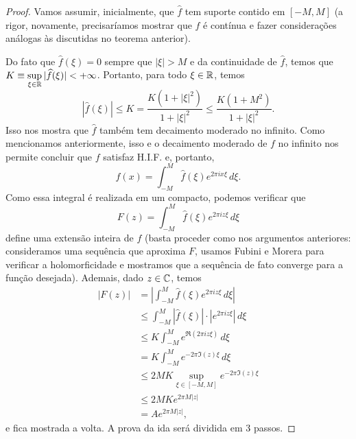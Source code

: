        \begin{proof}
            Vamos assumir, inicialmente, que $\widehat{f}$ tem suporte contido em $[-M,M]$ 
            (a rigor, novamente, precisaríamos mostrar que $\widehat{f}$ é contínua e fazer
            considerações análogas às discutidas no teorema anterior).
            
            Do fato que $\widehat{f}(\xi) = 0$ sempre que $|\xi| > M$ e da continuidade de $\widehat{f}$, 
            temos que $\displaystyle{ K\equiv \sup_{\xi\in\mathbb{R}} |\widehat{f}(\xi)| < +\infty }$.
            Portanto, para todo $\xi\in\mathbb{R}$, temos
            \begin{equation*}
                |\widehat{f}(\xi)| \leq K = \frac{K(1+|\xi|^2)}{1+|\xi|^2} \leq \frac{K(1 + M^2)}{1+|\xi|^2}.
            \end{equation*}
            Isso nos mostra que $\widehat{f}$ também tem decaimento moderado no infinito. Como 
            mencionamos anteriormente, isso e o decaimento moderado de $f$ no infinito nos permite
            concluir que $f$ satisfaz H.I.F. e, portanto,
            \begin{equation*}
                f(x) = \int_{-M}^M \widehat{f}(\xi) e^{2\pi ix\xi} \, d\xi.
            \end{equation*}
            Como essa integral é realizada em um compacto, podemos verificar que
            \begin{equation*}
                F(z) = \int_{-M}^M \widehat{f}(\xi) e^{2\pi iz\xi} \, d\xi
            \end{equation*}
            define uma extensão inteira de $f$ (basta proceder como
            nos argumentos anteriores: consideramos uma sequência
            que aproxima $F$, usamos Fubini e Morera para verificar
            a holomorficidade e mostramos que a sequência de fato
            converge para a função desejada). Ademais, dado $z\in\mathbb{C}$, temos
            \begin{align*}
                |F(z)| &= \left| \int_{-M}^M \widehat{f}(\xi) e^{2\pi iz\xi} \, d\xi \right| \\
                       &\leq \int_{-M}^M |\widehat{f}(\xi)|\cdot|e^{2\pi iz\xi}| \, d\xi \\
                       &\leq K \int_{-M}^M e^{\Re(2\pi iz\xi)} \, d\xi \\
                       &= K \int_{-M}^M e^{-2\pi\Im(z)\xi} \, d\xi \\
                       &\leq 2MK \sup_{\xi\in[-M,M]} e^{-2\pi\Im(z)\xi} \\
                       &\leq 2MKe^{2\pi M|z|} \\
                       &= Ae^{2\pi M|z|},
            \end{align*}
            e fica mostrada a volta. A prova da ida será dividida em 3 passos.

\end{proof}
